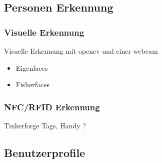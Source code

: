 \subsection{Personen Erkennung}
\subsubsection{Visuelle Erkennung}
Visuelle Erkennung mit opencv und einer webcam
 \begin{itemize}
      \item Eigenfaces 
      \item Fisherfaces 
\end{itemize}

\subsubsection{NFC/RFID Erkennung}
Tinkerforge Tags, Handy ?

\subsection{Benutzerprofile}